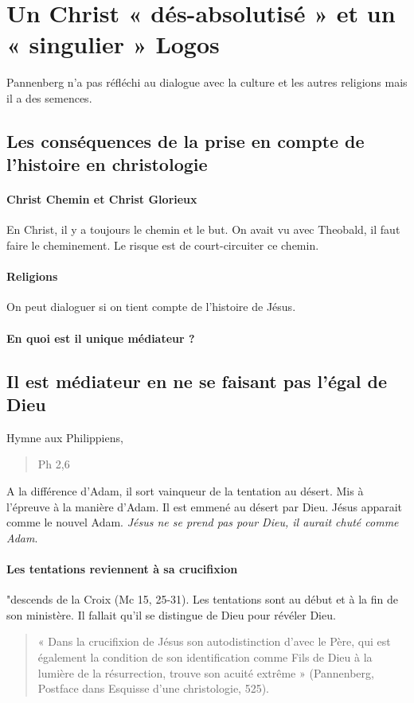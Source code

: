 \section{Un Christ « dés-absolutisé » et un « singulier » Logos}

Pannenberg n'a pas réfléchi au dialogue avec la culture et les autres religions mais il a des semences.

\subsection{Les conséquences de la prise en compte de l’histoire en christologie} 

\paragraph{Christ Chemin et Christ Glorieux} En Christ, il y a toujours le chemin et le but. On avait vu avec Theobald, il faut faire le cheminement. Le risque est de court-circuiter ce chemin.  

\paragraph{Religions} On peut dialoguer si on tient compte de l'histoire de Jésus. 
\paragraph{En quoi est il unique médiateur ? }

\subsection{Il est médiateur en ne se faisant pas l’égal de Dieu}
Hymne aux Philippiens, 
\begin{quote}
    Ph 2,6
\end{quote}
A la différence d'Adam, il sort vainqueur de la tentation au désert. Mis à l'épreuve à la manière d'Adam. Il est emmené au désert par Dieu. Jésus apparait comme le nouvel Adam. \textit{Jésus ne se prend pas pour Dieu, il aurait chuté comme Adam}.

\paragraph{Les tentations reviennent à sa crucifixion} "descends de la Croix (Mc 15, 25-31). Les tentations sont au début et à la fin de son ministère. Il fallait qu'il se distingue de Dieu pour révéler Dieu. 
\begin{quote}
    « Dans la crucifixion de Jésus son autodistinction d’avec le Père, qui est également la
condition de son identification comme Fils de Dieu à la lumière de la résurrection, trouve son
acuité extrême » (Pannenberg, Postface dans Esquisse d’une christologie, 525).
\end{quote}


